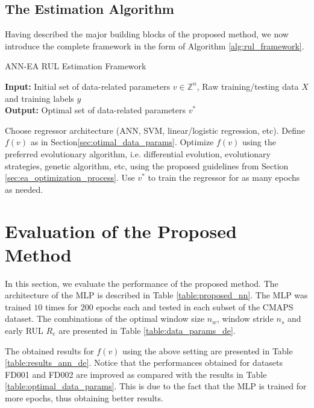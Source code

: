 \documentclass[12pt]{IEEEtran}%
\begin{document}
\subsection{The Estimation Algorithm}

Having described the major building blocks of the proposed method, we now
introduce the complete framework in the form of Algorithm \ref{alg:rul_framework}.

\setcounter{algorithm}{0} 
\begin{algorithm}[H]
\caption{\newline ANN-EA RUL Estimation Framework}\label{alg:rul_framework}
\textbf{Input:} Initial set of data-related parameters $v \in \mathbb{Z}^n$, 
Raw training/testing data $X$ and training labels $y$\\
\textbf{Output:} Optimal set of data-related parameters $v^*$
\begin{algorithmic}[1]
\State Choose regressor architecture (ANN, SVM, linear/logistic regression, etc).
\State Define $f(v)$ as in Section\ref{sec:otimal_data_params}.
\State Optimize $f(v)$ using the preferred evolutionary algorithm, i.e. 
differential evolution, evolutionary strategies, genetic algorithm, etc, using the proposed 
guidelines from Section \ref{sec:ea_optimization_process}.
\State Use $v^*$ to train the regressor for as many epochs as needed.
\end{algorithmic}
\end{algorithm}


\section{Evaluation of the Proposed Method}

\label{sec:rul_eval}

In this section, we evaluate the performance of the proposed method. The
architecture of the MLP is described in Table \ref{table:proposed_nn}. 
The MLP was trained $10$ times for $200$
epochs each and tested in each subset of the CMAPS dataset.
The combinations of the optimal window size $n_{w}$, window
stride $n_{s}$ and early RUL $R_{e}$ are presented in Table
\ref{table:data_params_de}.

The obtained results for $f(v)$ using the above setting are presented in Table
\ref{table:results_ann_de}. Notice that the performances obtained for datasets
FD001 and FD002 are improved as compared with the results 
in Table \ref{table:optimal_data_params}. This is due to the fact that the MLP is trained
for more epochs, thus obtaining better results.
\end{document}
